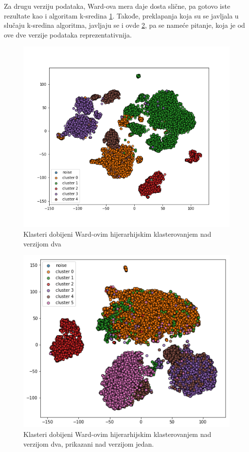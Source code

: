 \documentclass[a4paper]{article}
\begin{document}
Za drugu verziju podataka, Ward-ova mera daje dosta slične, pa gotovo iste rezultate kao i algoritam k-sredina \ref{ward_nav2}. Takođe, preklapanja koja su se javljala u slučaju k-sredina algoritma, javljaju se i ovde \ref{wardv2_nav1}, pa se nameće pitanje, koja je od ove dve verzije podataka reprezentativnija.

\begin{figure}[H]
\centering
\includegraphics[scale=0.5]{ward_nav2}
\caption{Klasteri dobijeni Ward-ovim hijerarhijskim klasterovanjem nad verzijom dva}
\label{ward_nav2}
\end{figure}

\begin{figure}[H]
\centering
\includegraphics[scale=0.5]{wardv2_nav1}
\caption{Klasteri dobijeni Ward-ovim hijerarhijskim klasterovanjem nad verzijom dva, prikazani nad verzijom jedan.}
\label{wardv2_nav1}
\end{figure}
\end{document}
